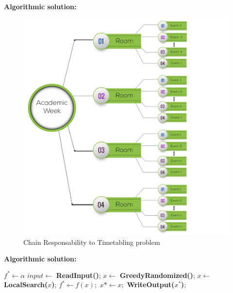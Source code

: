 \documentclass[centering]{report}
\newenvironment{slide}
    {\newpage
    \vspace*{\fill}
    }
    { 
     \vspace*{\fill}
    }
\begin{document}
\begin{slide}
\textbf{Algorithmic solution:}\\

\begin{figure}[h!]
  \centering
  \includegraphics[width=0.65\linewidth]{chainresponsability.png}
  \caption{\label{fig:methodologyflow2}Chain Responsability to Timetabling problem}
\end{figure}
\end{slide}

\begin{slide}
\textbf{Algorithmic solution:}\\

{\huge
  \begin{algorithmic}[1]
    \State $f^* \gets \alpha $
    \State $input \gets $ \textbf{ReadInput()};
        \State $x\gets $ \textbf{GreedyRandomized()};
        \State $x\gets $ \textbf{LocalSearch($x$)};
          \State $f^*\gets f(x);$
          \State $x*\gets x;$
        \EndIf    
      \EndFor
    \EndIf
    \State \textbf{WriteOutput($x^*$)};%
    \EndProcedure
  \end{algorithmic}
}
\end{slide}
\end{document}
